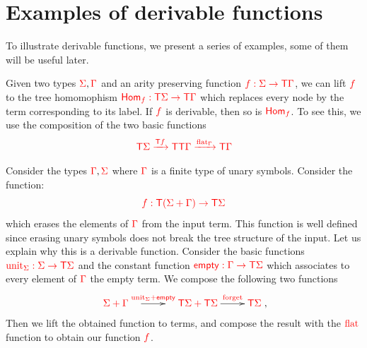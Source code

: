 \section{Examples of derivable functions}\label{sec:AppendixExamples}
To illustrate derivable functions, we present a series of examples, some of them will be useful later.


\noindent \begin{example}\label{ex:morphism} 
Given two types ${\color{red}{\Sigma}}, {\color{red}{\Gamma}}$ and an arity preserving  function ${\color{red}{f:\Sigma\to{\color{red}{\mathsf T}}\Gamma}}$, we can lift ${\color{red}{f}}$ to the tree homomophism  ${\color{red}{\mathsf{Hom}_f:{\color{red}{\mathsf T}}\Sigma\to {\color{red}{\mathsf T}}\Gamma}}$ which replaces every node by the term corresponding to its label. If ${\color{red}{f}}$ is derivable, then so is  ${\color{red}{\mathsf{Hom}_f}}$. To see this, we use the composition of the two basic functions
\begin{align*}
{\color{red}{{\color{red}{\mathsf T}}\Sigma\xrightarrow{{\color{red}{\mathsf T}}f}{\color{red}{\mathsf T}}{\color{red}{\mathsf T}}\Gamma \xrightarrow{{\color{red}{\mathrm{flat}}}_\Gamma} {\color{red}{\mathsf T}}\Gamma}}
\end{align*}
\end{example}

\noindent\begin{example}[Filter]\label{ex:filter} Consider the types ${\color{red}{\Gamma}}, {\color{red}{\Sigma}}$  where ${\color{red}{\Gamma}}$ is a finite type of unary symbols. Consider the function:
$$ {\color{red}{f:{\color{red}{\mathsf T}}({\color{red}{\Sigma}}+{\color{red}{\Gamma}})\to{\color{red}{\mathsf T}}{\color{red}{\Sigma}}}}$$
which erases the elements of ${\color{red}{\Gamma}}$ from the input term. This function is well defined since erasing unary symbols does not break the tree structure of the input.
Let us explain why this is a derivable function.
Consider the basic functions ${\color{red}{{\color{red}{\mathrm{unit}}}_{\color{red}{\Sigma}}:{\color{red}{\Sigma}}\to{\color{red}{\mathsf T}}{\color{red}{\Sigma}}}}$ and the constant function ${\color{red}{\mathsf{empty}:{\color{red}{\Gamma}}\to{\color{red}{\mathsf T}}{\color{red}{\Sigma}}}}$ which associates to every element of ${\color{red}{\Gamma}}$ the empty term. We compose the following two functions 
\begin{align*}
\xymatrix{
    \ranked{\rSigma+\rGamma}\quad \ar[r]^-{\ranked{\unit_\Sigma+\mathsf{empty}}} & \quad \ranked{\tmonad\rSigma+\tmonad\rSigma}\ar[r]^-{\ranked{\mathrm{forget}}} &\tmonad\rSigma
},
\end{align*}
Then we lift the obtained function to terms, and compose the result with the ${\color{red}{\mathrm{flat}}}$ function to obtain our function ${\color{red}{f}}$.  
\end{example}


